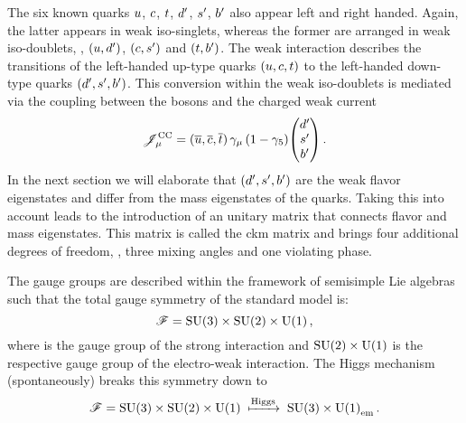 The six known quarks ${u}$, ${c}$, ${t}$, ${d}'$, ${s}'$, ${b}'$ also appear left and right handed.
Again, the latter appears in weak iso-singlets, whereas the former are arranged in weak iso-doublets, \ie{}, $({u},{d}')$, $({c},{s}')$ and $({t},{b}')$.
The weak interaction describes the transitions of the left-handed up-type quarks $({u},{c},{t})$ to the left-handed down-type quarks $({d}',{s}',{b}')$.
This conversion within the weak iso-doublets is mediated via the coupling between the \Wpm bosons and the charged weak current
\begin{equation*}
  \mathscr{J}_\mu^{\text{CC}} = ({\overline {{u}}}, {\overline {{c}}}, {\overline {{t}}}) \, \gamma_\mu \left(1-\gamma_5 \right) \! \begin{pmatrix} {\ensuremath{d}}' \\ {s}' \\ {b}' \end{pmatrix}.
\end{equation*}
In the next section we will elaborate that $({d}',{s}',{b}')$ are the weak flavor eigenstates and differ from the mass eigenstates of the quarks.
Taking this into account leads to the introduction of an unitary matrix that connects flavor and mass eigenstates.
This matrix is called the \gls{ckm} matrix and brings four additional degrees of freedom, \ie{}, three mixing angles and one \CP violating phase.

The gauge groups are described within the framework of semisimple Lie algebras such that the total gauge symmetry of the standard model is:
\begin{equation*}
  \mathscr{F} = {\mathrm{SU}(3)} \times {\ensuremath{\mathrm{SU}(2)}} \times {\ensuremath{\mathrm{U}(1)}} \,,
\end{equation*}
where \grpsuthree is the gauge group of the strong interaction and ${\mathrm{SU}(2)} \times {\ensuremath{\mathrm{U}(1)}}$ is the respective gauge group of the electro-weak interaction.
The Higgs mechanism (spontaneously) breaks this symmetry down to
\begin{equation*}
  \mathscr{F} = {\mathrm{SU}(3)} \times {\ensuremath{\mathrm{SU}(2)}} \times {\ensuremath{\mathrm{U}(1)}} \; \xmapsto{\text{Higgs}} \; {\mathrm{SU}(3)} \times {\ensuremath{\mathrm{U}(1)}}_\text{em} \,.
\end{equation*}

